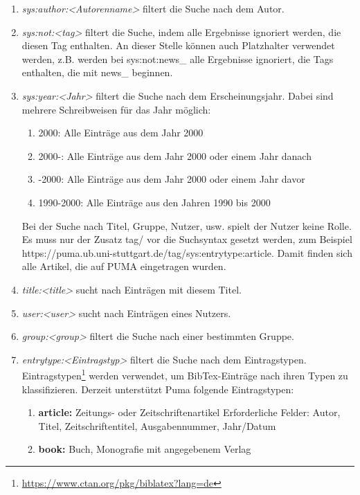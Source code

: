 \begin{enumerate}
    \item \textit{sys:author:<Autorenname>} filtert die Suche nach dem Autor.
		\item \textit{sys:not:<tag>} filtert die Suche, indem alle Ergebnisse ignoriert werden, die diesen Tag enthalten. An dieser Stelle können auch Platzhalter verwendet werden, z.B. werden bei sys:not:news\_ 
    alle Ergebnisse ignoriert, die Tags enthalten, die mit news\_
    beginnen.
    \item \textit{sys:year:<Jahr>} filtert die Suche nach dem Erscheinungsjahr. Dabei sind mehrere Schreibweisen für das Jahr möglich:
    \begin{enumerate}
        \item 2000: Alle Einträge aus dem Jahr 2000
        \item 2000-: Alle Einträge aus dem Jahr 2000 oder einem Jahr danach
        \item -2000: Alle Einträge aus dem Jahr 2000 oder einem Jahr davor
        \item 1990-2000: Alle Einträge aus den Jahren 1990 bis 2000
    \end{enumerate}
Bei der Suche nach Titel, Gruppe, Nutzer, usw. spielt der Nutzer keine Rolle. Es muss nur der Zusatz tag/ vor die Suchsyntax gesetzt werden, zum Beispiel  https://puma.ub.uni-stuttgart.de/tag/sys:entrytype:article. Damit finden sich alle Artikel, die auf PUMA eingetragen wurden.
    \item \textit{title:<title>} sucht nach Einträgen mit diesem Titel.
    \item \textit{user:<user>} sucht nach Einträgen eines Nutzers.
    \item \textit{group:<group>} filtert die Suche nach einer bestimmten Gruppe.
    \item \textit{entrytype:<Eintragstyp>} filtert die Suche nach dem Eintragstypen. Eintragstypen\footnote{\url{https://www.ctan.org/pkg/biblatex?lang=de}} werden verwendet, um BibTex-Einträge nach ihren Typen zu klassifizieren. Derzeit unterstützt Puma folgende Eintragstypen: 
    \begin{enumerate}
        \item \textbf{article:} Zeitungs- oder Zeitschriftenartikel\newline
        Erforderliche Felder: Autor, Titel, Zeitschriftentitel, Ausgabennummer, Jahr/Datum 
        \item \textbf{book:} Buch, Monografie mit angegebenem Verlag\newline

\end{enumerate}
\end{enumerate}
